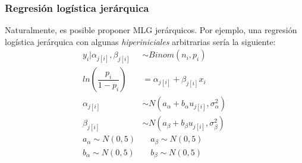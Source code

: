 \begin{table}
\centering
{}
\caption{Ejemplos esquemáticos de regresiones jerárquicas lineales. Fuente: elaboración propia.}
\label{tbl:Regr_Jer_Lineales}
\end{table}


\subsubsection*{Regresión logística jerárquica}

Naturalmente, es posible proponer MLG jerárquicos. Por ejemplo, una regresión logística jerárquica con algunas \textit{hiperiniciales} arbitrarias sería la siguiente: 
\begin{align*}
y_i|\alpha_{j[i]},\beta_{j[i]} & \sim Binom(n_i,p_i) \\
ln\left(\dfrac{p_i}{1-p_i}\right) &= \alpha_{j[i]} + \beta_{j[i]} x_i  \\ 
\alpha_{j[i]} & \sim N(a_{\alpha} + b_{\alpha} u_{j[i]}, \sigma_{\alpha}^2) \\ 
\beta_{j[i]} & \sim N(a_{\beta} + b_{\beta} u_{j[i]}, \sigma_{\beta}^2) \\ 
a_{\alpha} \sim N(0,5) & \quad  a_{\beta} \sim N(0,5) \\
b_{\alpha} \sim N(0,5) & \quad  b_{\beta} \sim N(0,5) 
\end{align*}

